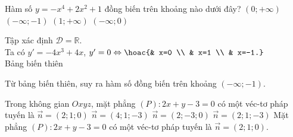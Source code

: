 \begin{ex}%
Hàm số $y=-x^4+2x^2+1$ đồng biến trên khoảng nào dưới đây?
\choice
{$(0;+\infty)$}
{\True $(-\infty;-1)$}
{$(1;+\infty)$}
{$(-\infty;0)$}
\loigiai
{
Tập xác định $\mathscr{D}=\mathbb{R}$.\\
Ta có $y'=-4x^3+4x$, $y'=0\Leftrightarrow \hoac{& x=0 \\ & x=1 \\ & x=-1.}$\\
Bảng biến thiên
\begin{center}
\end{center}
Từ bảng biến thiên, suy ra hàm số đồng biến trên khoảng $(-\infty;-1)$.
}
\end{ex}

\begin{ex}%
Trong không gian $O x y z$, mặt phẳng $(P)\colon 2x+y-3=0$ có một véc-tơ pháp tuyến là
\choice
{\True $\overrightarrow{n}=(2;1;0)$}
{$\overrightarrow{n}=(4;1;-3)$}
{$\overrightarrow{n}=(2;-3;0)$}
{$\overrightarrow{n}=(2;1;-3)$}
\loigiai
{
Mặt phẳng $(P)\colon 2x+y-3=0$ có một véc-tơ pháp tuyến là $\overrightarrow{n}=(2;1;0)$.
}
\end{ex}

